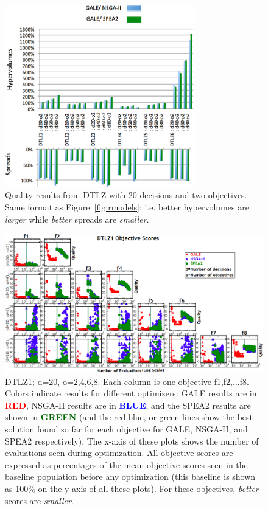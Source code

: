 \documentclass[10pt,journal,compsoc]{IEEEtran}
\newcommand{\fig}[1]{Figure~\ref{fig:#1}}
\newenvironment{changed}{\par\color{MyDarkBlue}}{\par}
\begin{document}
\begin{changed}
\begin{figure}
\includegraphics[width=3.25in]{dtlzResults1.png}
\caption{Quality results from DTLZ with 20 decisions and two objectives.
Same format as \fig{rmodels}; i.e. better hypervolumes are {\em larger} while {\em better} spreads are {\em smaller}.}\label{fig:dtlz}
\end{figure}
\begin{figure}[!b]
\includegraphics[width=6.8in]{dtlzResults2.png}
\caption{DTLZ1; d=20, o=2,4,6,8.
Each column is one objective f1,f2,...f8. Colors indicate results
for different optimizers:
GALE results are in 
\textcolor{red}{{\bf RED}},
NSGA-II results are in 
 \textcolor{blue}{{\bf BLUE}},
and the SPEA2 results are shown in 
  \textcolor{darkgreen}{{\bf GREEN}}
(and the 
red,blue, or green lines show the best solution found so far for each
objective for GALE, NSGA-II, and SPEA2 respectively). 
The x-axis of these
plots shows the number of evaluations seen during optimization.
All objective scores are expressed as percentages
of the mean objective scores seen in the baseline population before any optimization
(this baseline is shown as 100\% on the y-axis of all these plots). 
For these objectives, {\em better} scores are {\em smaller}.
}\label{fig:o2468}
\end{figure}




\end{changed}
\end{document}
